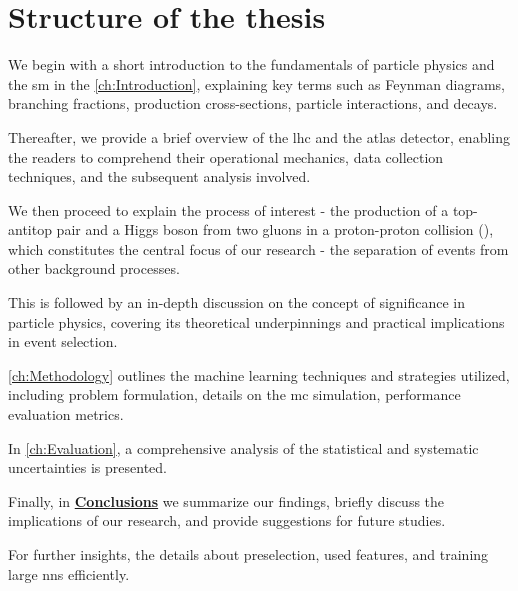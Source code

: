 \chapter*{Structure of the thesis}

We begin with a short introduction to the fundamentals of particle physics and the \gls{sm} in the
\autoref{ch:Introduction}, explaining key terms such as Feynman diagrams, branching fractions, production
cross-sections, particle interactions, and decays.

Thereafter, we provide a brief overview of the \gls{lhc} and the \gls{atlas} detector, enabling the readers to
comprehend their operational mechanics, data collection techniques, and the subsequent analysis involved.

We then proceed to explain the process of interest - the production of a top-antitop pair and a Higgs boson from two
gluons in a proton-proton collision (\tth), which constitutes the central focus of our research - the separation of \tth
events from other background processes.

This is followed by an in-depth discussion on the concept of significance in particle physics, covering its theoretical
underpinnings and practical implications in event selection.

\autoref{ch:Methodology} outlines the machine learning techniques and strategies utilized, including
problem formulation, details on the \gls{mc} simulation, performance evaluation metrics.

In \autoref{ch:Evaluation}, a comprehensive analysis of the statistical and systematic uncertainties is
presented.

Finally, in \hyperref[ch:conclusions]{\textbf{Conclusions}} we summarize our findings, briefly discuss the implications
of our research, and provide suggestions for future studies.

For further insights, the \textbf{} details about preselection, used features, and training large
\glspl{nn} efficiently.

\glsresetall